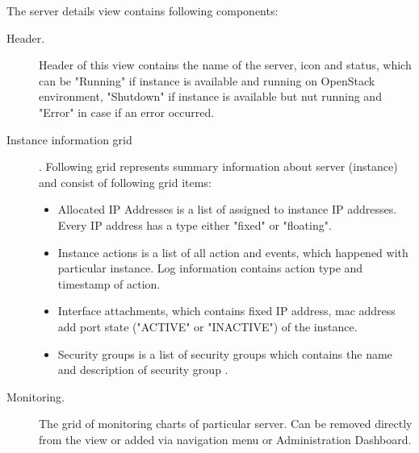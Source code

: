 The server details view contains following components:
\begin{description}
\item[Header.] Header of this view  contains the name of the server, icon and status, which can be "Running" if instance is available and running on OpenStack environment, "Shutdown" if instance is available but nut running and "Error" in case if an error occurred. 
\item[Instance information grid]. Following grid represents summary information about server (instance) and consist of following grid items:
\begin{itemize}
\item Allocated IP Addresses is a list of assigned to instance IP addresses. Every IP address has a type either "fixed" or "floating".
\item Instance actions is a list of all action and events, which happened with particular instance. Log information contains action type and timestamp of action.
\item Interface attachments, which contains fixed IP address, mac address add port state ("ACTIVE" or "INACTIVE") of the instance.
\item Security groups is a list of security groups which contains the name and description of security group . 
\end{itemize}
\item[Monitoring.] The grid of monitoring charts of particular server. Can be removed directly from the view or added via navigation menu or Administration Dashboard.
\end{description}


